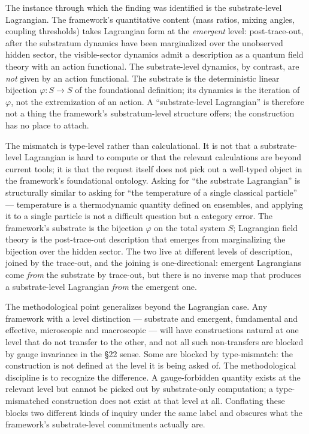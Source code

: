 \documentclass[
]{article}
\begin{document}
The instance through which the finding was identified is the
substrate-level Lagrangian. The framework's quantitative content (mass
ratios, mixing angles, coupling thresholds) takes Lagrangian form at the
\emph{emergent} level: post-trace-out, after the substratum dynamics
have been marginalized over the unobserved hidden sector, the
visible-sector dynamics admit a description as a quantum field theory
with an action functional. The substrate-level dynamics, by contrast,
are \emph{not} given by an action functional. The substrate is the
deterministic linear bijection \(\varphi: S \to S\) of the foundational
definition; its dynamics is the iteration of \(\varphi\), not the
extremization of an action. A ``substrate-level Lagrangian'' is
therefore not a thing the framework's substratum-level structure offers;
the construction has no place to attach.

The mismatch is type-level rather than calculational. It is not that a
substrate-level Lagrangian is hard to compute or that the relevant
calculations are beyond current tools; it is that the request itself
does not pick out a well-typed object in the framework's foundational
ontology. Asking for ``the substrate Lagrangian'' is structurally
similar to asking for ``the temperature of a single classical particle''
--- temperature is a thermodynamic quantity defined on ensembles, and
applying it to a single particle is not a difficult question but a
category error. The framework's substrate is the bijection \(\varphi\)
on the total system \(S\); Lagrangian field theory is the post-trace-out
description that emerges from marginalizing the bijection over the
hidden sector. The two live at different levels of description, joined
by the trace-out, and the joining is one-directional: emergent
Lagrangians come \emph{from} the substrate by trace-out, but there is no
inverse map that produces a substrate-level Lagrangian \emph{from} the
emergent one.

The methodological point generalizes beyond the Lagrangian case. Any
framework with a level distinction --- substrate and emergent,
fundamental and effective, microscopic and macroscopic --- will have
constructions natural at one level that do not transfer to the other,
and not all such non-transfers are blocked by gauge invariance in the
§22 sense. Some are blocked by type-mismatch: the construction is not
defined at the level it is being asked of. The methodological discipline
is to recognize the difference. A gauge-forbidden quantity exists at the
relevant level but cannot be picked out by substrate-only computation; a
type-mismatched construction does not exist at that level at all.
Conflating these blocks two different kinds of inquiry under the same
label and obscures what the framework's substrate-level commitments
actually are.
\end{document}
